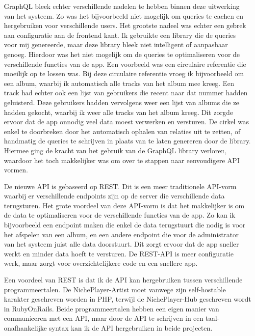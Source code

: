 GraphQL bleek echter verschillende nadelen te hebben binnen deze uitwerking van het systeem. Zo was het bijvoorbeeld niet mogelijk om queries te cachen en hergebruiken voor verschillende users. Het grootste nadeel was echter een gebrek aan configuratie aan de frontend kant. Ik gebruikte een library die de queries voor mij genereerde, maar deze library bleek niet intelligent of aanpasbaar genoeg. Hierdoor was het niet mogelijk om de queries te optimaliseren voor de verschillende functies van de app. Een voorbeeld was een circulaire referentie die moeilijk op te lossen was. Bij deze circulaire referentie vroeg ik bijvoorbeeld  om een album, waarbij ik automatisch alle tracks van het album mee kreeg. Een track had echter ook een lijst van gebruikers die recent naar dat nummer hadden geluisterd. Deze gebruikers hadden vervolgens weer een lijst van albums die ze hadden gekocht, waarbij ik weer alle tracks van het album kreeg. Dit zorgde ervoor dat de app onnodig veel data moest verwerken en versturen. De cirkel was enkel te doorbreken door het automatisch ophalen van relaties uit te zetten, of handmatig de queries te schrijven in plaats van te laten genereren door de library. Hiermee ging de kracht van het gebruik van de GraphQL library verloren, waardoor het toch makkelijker was om over te stappen naar eenvoudigere API vormen.

De nieuwe API is gebaseerd op REST. Dit is een meer traditionele API-vorm waarbij er verschillende endpoints zijn op de server die verschillende data terugsturen. Het grote voordeel van deze API-vorm is dat het makkelijker is om de data te optimaliseren voor de verschillende functies van de app. Zo kan ik bijvoorbeeld een endpoint maken die enkel de data terugstuurt die nodig is voor het afspelen van een album, en een andere endpoint die voor de administrator van het systeem juist alle data doorstuurt. Dit zorgt ervoor dat de app sneller werkt en minder data hoeft te versturen. De REST-API is meer configuratie werk, maar zorgt voor overzichtelijkere code en een snellere app.

Een voordeel van REST is dat ik de API kan hergebruiken tussen verschillende programmeertalen. De NichePlayer-Artist moet vanwege zijn self-hostable karakter geschreven worden in PHP, terwijl de NichePlayer-Hub geschreven wordt in RubyOnRails. Beide programmeertalen hebben een eigen manier van communiceren met een API, maar door de API te schrijven in een taal-onafhankelijke syntax kan ik de API hergebruiken in beide projecten.

